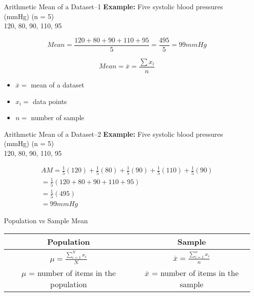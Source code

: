 \begin{frame}[t]{Arithmetic Mean of a Dataset--1}
	\textbf{Example:} Five systolic blood pressures (mmHg) (n = 5) \\ 
	120, 80, 90, 110, 95
	
	$$
	Mean = 
	 \frac{120+80+90+110+95}{5}
	= \frac{495}{5}
	= 99mmHg 
	$$
	
	$$
	Mean = \overline{x}  = \frac{\sum x_i }{n}
	$$
	
	\begin{itemize}
		\item $	\overline{x} = $ mean of a dataset
		\item $	x_i =$ data points 
		\item $	n =$ number of sample 
	\end{itemize}
\end{frame}

\begin{frame}[t]{Arithmetic Mean of a Dataset--2}
	\textbf{Example:} Five systolic blood pressures (mmHg) (n = 5) \\ 
	120, 80, 90, 110, 95
	
\[
\begin{array}{l}
AM=	\frac{1}{5}(120)+\frac{1}{5}(80)+\frac{1}{5}(90)+\frac{1}{5}(110)+
\frac{1}{5}(90) \\ 
= \frac{1}{5}(120+80+90+110+95) \\ 
= \frac{1}{5}(495) \\ 
= 99mmHg
\end{array}
\]

\end{frame}



\begin{frame}[t]{Population vs Sample Mean}
	\begin{center}
		\begin{tabular}{|c|c|} 
			\hline 
			Population & Sample \\ 
			\hline 
			$\mu  = \frac{\sum_{i=1}^{N} x_i }{N}$ & $\overline{x}  = 
			\frac{\sum_{i=1}^{n} 
			x_i }{n}$ \\
		 \hline
		$\mu$ = number of items in the population  & $\overline{x}$ = number of 
		items in the sample \\ 
		\hline 
		\end{tabular}
	\end{center}
\end{frame}


